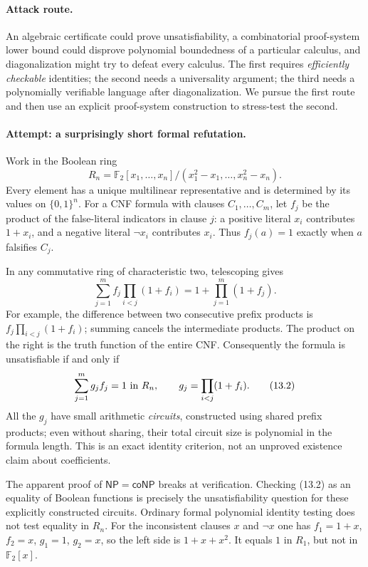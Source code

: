 \documentclass[11pt,a4paper]{article}
\newcommand{\F}{\mathbb{F}}
\begin{document}
\paragraph{Attack route.}
An algebraic certificate could prove unsatisfiability, a combinatorial
proof-system lower bound could disprove polynomial boundedness of a
particular calculus, and diagonalization might try to defeat every
calculus. The first requires \emph{efficiently checkable} identities;
the second needs a universality argument; the third needs a polynomially
verifiable language after diagonalization. We pursue the first route and
then use an explicit proof-system construction to stress-test the second.

\paragraph{Attempt: a surprisingly short formal refutation.}
Work in the Boolean ring
\[
 R_n=\F_2[x_1,\ldots,x_n]/(x_1^2-x_1,\ldots,x_n^2-x_n).
\]
Every element has a unique multilinear representative and is determined
by its values on $\{0,1\}^n$. For a CNF formula with clauses
$C_1,\ldots,C_m$, let $f_j$ be the product of the false-literal
indicators in clause $j$: a positive literal $x_i$ contributes $1+x_i$,
and a negative literal $\neg x_i$ contributes $x_i$. Thus
$f_j(a)=1$ exactly when $a$ falsifies $C_j$.

In any commutative ring of characteristic two, telescoping gives
\[
 \sum_{j=1}^m f_j\prod_{i<j}(1+f_i)
   =1+\prod_{j=1}^m(1+f_j). \tag{13.1}
\]
For example, the difference between two consecutive prefix products is
$f_j\prod_{i<j}(1+f_i)$; summing cancels the intermediate products.
The product on the right is the truth function of the entire CNF.
Consequently the formula is unsatisfiable if and only if
\[
 \sum_{j=1}^m g_j f_j=1\ \hbox{in }R_n,
 \qquad g_j=\prod_{i<j}(1+f_i). \tag{13.2}
\]
All the $g_j$ have small arithmetic \emph{circuits}, constructed using
shared prefix products; even without sharing, their total circuit size
is polynomial in the formula length. This is an exact identity
criterion, not an unproved existence claim about coefficients.

The apparent proof of $\mathsf{NP}=\mathsf{coNP}$ breaks at verification.
Checking (13.2) as an equality of Boolean functions is precisely the
unsatisfiability question for these explicitly constructed circuits.
Ordinary formal polynomial identity testing does not test equality in
$R_n$. For the inconsistent clauses $x$ and $\neg x$ one has
$f_1=1+x$, $f_2=x$, $g_1=1$, $g_2=x$, so the left side is
$1+x+x^2$. It equals $1$ in $R_1$, but not in $\F_2[x]$.
\end{document}
